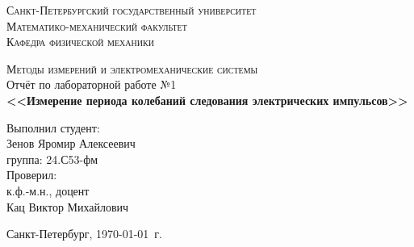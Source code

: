 \begin{titlepage}
\begin{center}
\textsc{Санкт-Петербургский государственный университет\\
Математико-механический факультет\\
Кафедра физической механики\\}

\vfill

\textsc{Методы измерений и электромеханические системы\\[3mm]}
Отчёт по лабораторной работе №1\\[6mm]


\textbf{\large<<Измерение периода колебаний следования электрических импульсов>>}

\vfill
\end{center}

\hfill
\begin{minipage}{.5\textwidth}
Выполнил студент:\\[2mm] 
Зенов Яромир Алексеевич\\
группа: 24.С53-фм\\[5mm]

Проверил:\\[2mm] 
к.ф.-м.н., доцент\\
Кац Виктор Михайлович
\end{minipage}%
\vfill
\begin{center}
 Санкт-Петербург, \yeardate\today\ г.
\end{center}
\end{titlepage}
